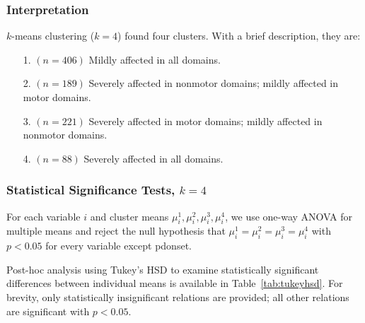 \documentclass[10pt]{article}
\begin{document}
\begin{multicols}{2}
\subsubsection{Interpretation}
$k$-means clustering ($k = 4$) found four clusters. With a brief description,
they are:

\begin{itemize}
  \item[1.] $(n = 406)$ Mildly affected in all domains.
  \item[2.] $(n = 189)$ Severely affected in nonmotor domains; mildly
    affected in motor domains.
  \item[3.] $(n = 221)$ Severely affected in motor domains; mildly
    affected in nonmotor domains.
  \item[4.] $(n = 88)$ Severely affected in all domains.
\end{itemize}

\subsubsection{Statistical Significance Tests, $k = 4$}
For each variable $i$ and cluster means $\mu_i^1, \mu_i^2, \mu_i^3, \mu_i^4$,
we use one-way ANOVA for multiple means and reject the null hypothesis that
$\mu_i^1 = \mu_i^2 = \mu_i^3 = \mu_i^4$ with $p < 0.05$ for every variable
except pdonset.

Post-hoc analysis using Tukey's HSD to examine statistically significant
differences between individual means is available in Table~\ref{tab:tukeyhsd}.
For brevity, only statistically insignificant relations are provided; all other
relations are significant with $p < 0.05$.


\end{multicols}
\end{document}

